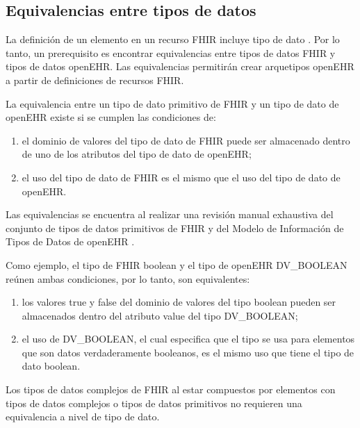 \subsection{Equivalencias entre tipos de datos}

La definición de un elemento en un recurso FHIR incluye tipo de dato \cite{FHIRElement}. Por lo tanto, un prerequisito es encontrar equivalencias entre tipos de datos FHIR y tipos de datos openEHR. Las equivalencias permitirán crear arquetipos openEHR a partir de definiciones de recursos FHIR.

La equivalencia entre un tipo de dato primitivo de FHIR y un tipo de dato de openEHR existe si se cumplen las condiciones de:

\begin{enumerate}
  \item el dominio de valores del tipo de dato de FHIR puede ser almacenado dentro de uno de los atributos del tipo de dato de openEHR;
  \item el uso del tipo de dato de FHIR es el mismo que el uso del tipo de dato de openEHR.
\end{enumerate}

Las equivalencias se encuentra al realizar una revisión manual exhaustiva del conjunto de tipos de datos primitivos de FHIR \cite{FHIRDataTypes} y del Modelo de Información de Tipos de Datos de openEHR \cite{openEHRDataTypes}.

Como ejemplo, el tipo de FHIR boolean y el tipo de openEHR DV\_BOOLEAN reúnen ambas condiciones, por lo tanto, son equivalentes:
\begin{enumerate}
  \item los valores true y false del dominio de valores del tipo boolean pueden ser almacenados dentro del atributo value del tipo DV\_BOOLEAN;
  \item el uso de DV\_BOOLEAN, el cual especifica que el tipo se usa para elementos que son datos verdaderamente booleanos, es el mismo uso que tiene el tipo de dato boolean.
\end{enumerate}

Los tipos de datos complejos de FHIR al estar compuestos por elementos con tipos de datos complejos o tipos de datos primitivos no requieren una equivalencia a nivel de tipo de dato.

